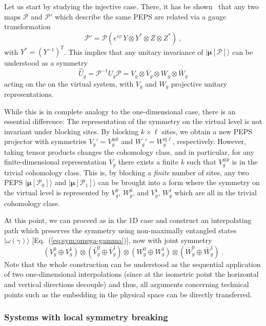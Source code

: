 \documentclass[twocolumn,superscriptaddress,prb,linenumbers]{revtex4-1}
\newcommand{\ket}[1]{\vert#1\rangle}
\newcommand{\MPS}[1]{| {\bm\mu}[#1]\rangle}
\newcommand{\mc}[1]{\mathcal{#1}}
\begin{document}
Let us start by studying the injective case. There, it has be
shown~\cite{perez-garcia:inj-peps-syms} that
any two maps $\mc P$ and $\mc P'$ which describe the same PEPS are related
via a gauge transformation
\begin{equation}
    \label{eq:2D-sym:inj-gauge-transform}
    \mc P' = \mc P(e^{i\phi}\,Y\otimes Y^*\otimes Z \otimes Z^*)\ ,
\end{equation}
with $Y^*=(Y^{-1})^T$. This implies that any unitary invariance of
$\MPS{\mc P}$ can be understood as a symmetry
\[
    \hat U_g = \mc P^{-1} U_g \mc P
    =V_g\otimes \bar V_g\otimes W_g\otimes \bar W_g
\]
acting on the on the virtual system, with $V_g$ and $W_g$ projective
unitary representations.

While this is in complete analogy to the one-dimensional case, there is an
essential difference: The representation of the symmetry on the virtual
level is not invariant under blocking sites. By blocking $k\times \ell$
sites, we obtain a new PEPS projector with symmetries $V_g'=V^{\otimes
            k}_g$ and $W_g'=W_g^{\otimes \ell}$, respectively. However, taking tensor
products changes the cohomology class, and in particular, for
any finite-dimensional representation $V_g$ there exists a finite $k$ such
that $V_g^{\otimes k}$ is in the trivial cohomology class. This is, by
blocking a \emph{finite} number of sites, any two PEPS $\MPS{\mc P_0}$ and
$\MPS{\mc P_1}$ can be brought into a form where the symmetry on the
virtual level is represented by $V_g^0$, $W_g^0$, and $V_g^1$, $W_g^1$
which are all in the trivial cohomology class.

At this point, we can proceed as in the 1D case and construct an
interpolating path which preserves the symmetry using
non-maximally entangled states $\ket{\omega(\gamma)}$
[Eq.~(\ref{eq:sym:omega-gamma})], now with joint symmetry
\[
    (V_g^0\oplus V_g^1)\otimes
    (\bar V_g^0\oplus\bar V_g^1)\otimes
    (W_g^0\oplus W_g^1)\otimes
    (\bar W_g^0\oplus\bar W_g^1)\ .
\]
Note that the whole construction can be understood as the sequential
application of two one-dimensional interpolations (since at the isometric
point the horizontal and vertical directions decouple) and thus, all
arguments concerning technical points such as the embedding in the
physical space can be directly transferred.

\subsubsection{Systems with local symmetry breaking}
\end{document}
